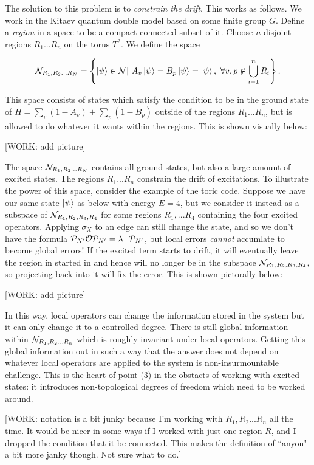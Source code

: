 The solution to this problem is to \textit{constrain the drift}. This works as follows. We work in the Kitaev quantum double model based on some finite group $G$. Define a \textit{region} in a space to be a compact connected subset of it. Choose $n$ disjoint regions $R_1...R_n$ on the torus $T^2$. We define the space


$$\mathcal{N}_{R_1,R_2... R_N}=\left\{\ket{\psi}\in \mathcal{N} | \,\, A_v\ket{\psi}=B_p\ket{\psi}=\ket{\psi},\,\, \forall v,p\not\in \bigcup_{i=1}^n R_i \right\}.$$

This space consists of states which satisfy the condition to be in the ground state of $H=\sum_{v}(1-A_v)+\sum_p(1-B_p)$ outside of the regions  $R_1...R_n$, but is allowed to do whatever it wants within the regions. This is shown visually below:

[WORK: add picture]

The space $\mathcal{N}_{R_1,R_2... R_N}$ contains all ground states, but also a large amount of excited states. The regions $R_1... R_n$ constrain the drift of excitations. To illustrate the power of this space, consider the example of the toric code. Suppose we have our same state $\ket{\psi}$ as below with energy $E=4$, but we consider it instead as a subspace of $\mathcal{N}_{R_1,R_2,R_3,R_4}$ for some regions $R_1,...R_4$ containing the four excited operators. Applying $\sigma_X$ to an edge can still change the state, and so we don't have the formula $\mathcal{P}_{N'}\mathcal{O} \mathcal{P}_{N'}=\lambda\cdot \mathcal{P}_{N'}$, but local errors \textit{cannot} accumlate to become global errors! If the excited term starts to drift, it will eventually leave the region in started in and hence will no longer be in the subspace $\mathcal{N}_{R_1,R_2,R_3,R_4}$, so projecting back into it will fix the error. This is shown pictorally below:

[WORK: add picture]

In this way, local operators can change the information stored in the system but it can only change it to a controlled degree. There is still global information within $\mathcal{N}_{R_1,R_2... R_n}$ which is roughly invariant under local operators. Getting this global information out in such a way that the answer does not depend on whatever local operators are applied to the system is non-insurmountable challenge. This is the heart of point (3) in the obstacts of working with excited states: it introduces non-topological degrees of freedom which need to be worked around.

[WORK: notation is a bit junky because I'm working with $R_1,R_2... R_n$ all the time. It would be nicer in some ways if I worked with just one region $R$, and I dropped the condition that it be connected. This makes the definition of ``anyon" a bit more janky though. Not sure what to do.]

